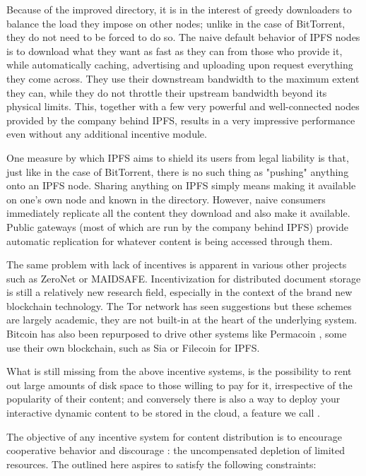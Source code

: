 Because of the improved directory, it is in the interest of greedy downloaders to balance the load they impose on other nodes; unlike in the case of BitTorrent, they do not need to be forced to do so. The naive default behavior of IPFS nodes is to download what they want as fast as they can from those who provide it, while automatically caching, advertising and uploading upon request everything they come across. They use their downstream bandwidth to the maximum extent they can, while they do not throttle their upstream bandwidth beyond its physical limits. This, together with a few very powerful and well-connected nodes provided by the company behind IPFS, results in a very impressive performance even without any additional incentive module.


One measure by which IPFS aims to shield its users from legal liability is that, just like in the case of BitTorrent, there is no such thing as "pushing" anything onto an IPFS node. Sharing anything on IPFS simply means making it available on one's own node and known in the directory. However, naive consumers immediately replicate all the content they download and also make it available. Public  gateways (most of which are run by the company behind IPFS) provide automatic replication for whatever content is being accessed through them.

The same problem with lack of incentives is apparent in various other projects such as ZeroNet or MAIDSAFE. Incentivization for distributed document storage is still a relatively new research field, especially in the context of the brand new blockchain technology. The Tor network has seen suggestions \cite{jansen2014onions,hoshetal2014tor} but these schemes are largely academic, they are not built-in at the heart of the underlying system. Bitcoin has also been repurposed to drive other systems like Permacoin \cite{miller2014permacoin}, some use their own blockchain, such as Sia \cite{vorick2014sia} or Filecoin \cite{filecoin2014} for IPFS.

What is still missing from the above incentive systems, is the possibility to rent out large amounts of disk space to those willing to pay for it, irrespective of the popularity of their content; and conversely there is also a way to deploy your interactive dynamic content to be stored in the cloud, a feature we call .

The objective of any incentive system for  content distribution is to encourage cooperative behavior and discourage : the uncompensated depletion of limited resources. The  outlined here aspires to satisfy the following constraints:

